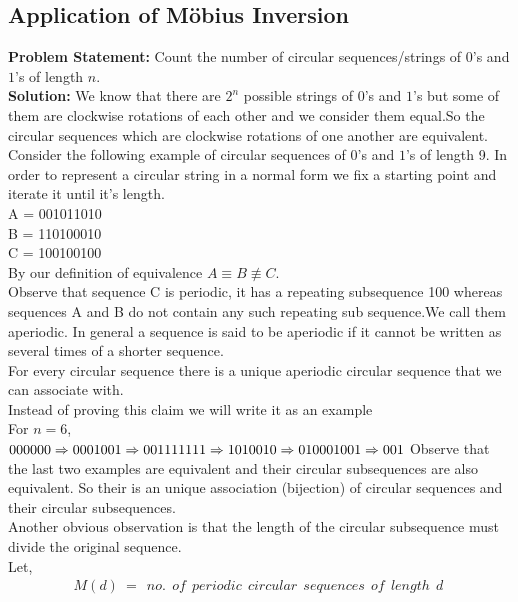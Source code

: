 \subsection{Application of Möbius Inversion} \label{Application of Möbius Inversion}
\textbf{Problem Statement:} Count the number of circular sequences/strings of $0$'s and $1$'s of length $n$.\\
\textbf{Solution:} We know that there are $2^n$ possible strings of $0$'s and $1$'s but some of them are clockwise rotations of each other and we consider them equal.So the circular sequences which are clockwise rotations of one another are equivalent. \\
Consider the following example of circular sequences of $0$'s and $1$'s of length 9. In order to represent a circular string in a normal form we fix a starting point and iterate it until it's length.    \\
A = 001011010\\
B = 110100010\\
C = 100100100\\
By our definition of equivalence $A \equiv B \not\equiv C$. \\
Observe that sequence C is periodic, it has a repeating subsequence 100 whereas sequences A and B do not contain any such repeating sub sequence.We call them aperiodic. In general a sequence is said to be aperiodic if it cannot be written as several times of a shorter sequence. \\
For every circular sequence there is a unique aperiodic circular sequence that we can associate with.\\
Instead of proving this claim we will write it as an example \\
For $n=6$,\\
$
000000  \Rightarrow  0 \\
001001  \Rightarrow 001 \\
111111  \Rightarrow  1 \\
010010  \Rightarrow 010 \\
001001  \Rightarrow 001 \\
$
Observe that the last two examples are equivalent and their circular subsequences are also equivalent. So their is an unique association (bijection) of circular sequences and their circular subsequences. \\
Another obvious observation is that the length of the circular subsequence must divide the original sequence. \\
Let, 
\begin{align}
M(d) ~=~ ~no.~ ~of~ ~periodic~ ~circular~ ~sequences~ ~of~ ~length~ ~d~ \nonumber
\end{align}  
